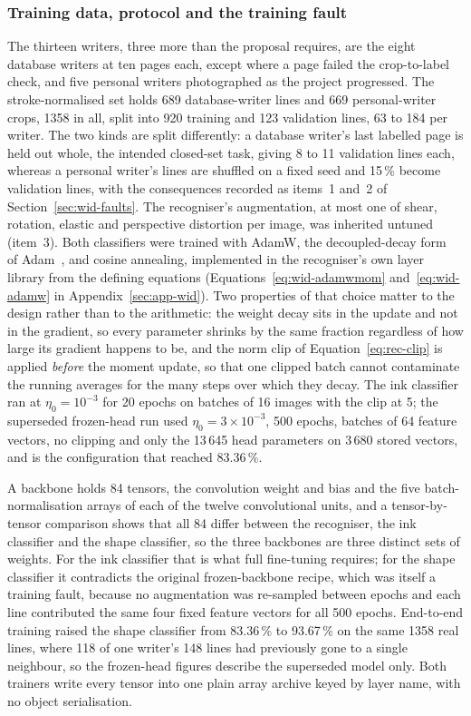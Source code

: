 \subsubsection{Training data, protocol and the training fault}

The thirteen writers, three more than the proposal requires, are the eight database writers at ten pages each, except where a page failed the crop-to-label check, and five personal writers photographed as the project progressed.
The stroke-normalised set holds 689 database-writer lines and 669 personal-writer crops, 1358 in all, split into 920 training and 123 validation lines, 63 to 184 per writer.
The two kinds are split differently: a database writer's last labelled page is held out whole, the intended closed-set task, giving 8 to 11 validation lines each, whereas a personal writer's lines are shuffled on a fixed seed and 15\,\% become validation lines, with the consequences recorded as items~1 and~2 of Section~\ref{sec:wid-faults}.
The recogniser's augmentation, at most one of shear, rotation, elastic and perspective distortion per image, was inherited untuned (item~3).
Both classifiers were trained with AdamW, the decoupled-decay form~\cite{loshchilov2019} of Adam~\cite{kingma2015}, and cosine annealing, implemented in the recogniser's own layer library from the defining equations (Equations~\ref{eq:wid-adamwmom} and~\ref{eq:wid-adamw} in Appendix~\ref{sec:app-wid}).
Two properties of that choice matter to the design rather than to the arithmetic: the weight decay sits in the update and not in the gradient, so every parameter shrinks by the same fraction regardless of how large its gradient happens to be, and the norm clip of Equation~\ref{eq:rec-clip} is applied \emph{before} the moment update, so that one clipped batch cannot contaminate the running averages for the many steps over which they decay.
The ink classifier ran at $\eta_0=10^{-3}$ for 20 epochs on batches of 16 images with the clip at 5; the superseded frozen-head run used $\eta_0=3\times10^{-3}$, 500 epochs, batches of 64 feature vectors, no clipping and only the 13\,645 head parameters on 3\,680 stored vectors, and is the configuration that reached 83.36\,\%.

A backbone holds 84 tensors, the convolution weight and bias and the five batch-normalisation arrays of each of the twelve convolutional units, and a tensor-by-tensor comparison shows that all 84 differ between the recogniser, the ink classifier and the shape classifier, so the three backbones are three distinct sets of weights.
For the ink classifier that is what full fine-tuning requires; for the shape classifier it contradicts the original frozen-backbone recipe, which was itself a training fault, because no augmentation was re-sampled between epochs and each line contributed the same four fixed feature vectors for all 500 epochs.
End-to-end training raised the shape classifier from 83.36\,\% to 93.67\,\% on the same 1358 real lines, where 118 of one writer's 148 lines had previously gone to a single neighbour, so the frozen-head figures describe the superseded model only.
Both trainers write every tensor into one plain array archive keyed by layer name, with no object serialisation.

